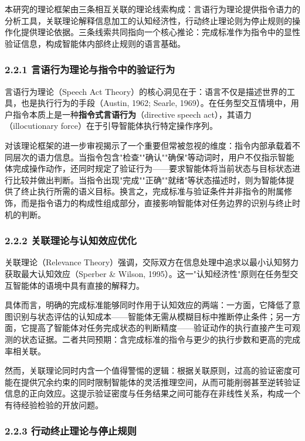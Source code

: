 \documentclass[12pt,a4paper,openany,oneside]{ctexrep}
\begin{document}
本研究的理论框架由三条相互关联的理论线索构成：言语行为理论提供指令语力的分析工具，关联理论解释信息加工的认知经济性，行动终止理论则为停止规则的操作化提供理论依据。三条线索共同指向一个核心推论：完成标准作为指令中的显性验证信息，构成智能体内部终止规则的语言基础。

\subsubsection{2.2.1 言语行为理论与指令中的验证行为}


言语行为理论（Speech Act Theory）的核心洞见在于：语言不仅是描述世界的工具，也是执行行为的手段（Austin, 1962; Searle, 1969）。在任务型交互情境中，用户指令本质上是一种\textbf{指令式言语行为}（directive speech act），其语力（illocutionary force）在于引导智能体执行特定操作序列。

对该理论框架的进一步审视揭示了一个重要但常被忽视的维度：指令内部承载着不同层次的语力信息。当指令包含"检查""确认""确保"等动词时，用户不仅指示智能体完成操作动作，还同时规定了验证行为——要求智能体将当前状态与目标状态进行比较并做出判断。当指令出现"完成""正确""就绪"等状态描述时，则为智能体提供了终止执行所需的语义目标。换言之，完成标准与验证条件并非指令的附属修饰，而是指令语力的构成性组成部分，直接影响智能体对任务边界的识别与终止时机的判断。

\subsubsection{2.2.2 关联理论与认知效应优化}


关联理论（Relevance Theory）强调，交际双方在信息处理中追求以最小认知努力获取最大认知效应（Sperber \& Wilson, 1995）。这一"认知经济性"原则在任务型交互智能体的语境中具有直接的解释力。

具体而言，明确的完成标准能够同时作用于认知效应的两端：一方面，它降低了意图识别与状态评估的认知成本——智能体无需从模糊目标中推断停止条件；另一方面，它提高了智能体对任务完成状态的判断精度——验证动作的执行直接产生可观测的状态证据。二者共同预期：含完成标准的指令与更少的执行步数和更高的完成率相关联。

然而，关联理论同时内含一个值得警惕的逻辑：根据关联原则，过高的验证密度可能在提供冗余约束的同时限制智能体的灵活推理空间，从而可能削弱甚至逆转验证信息的正向效应。这提示验证密度与任务结果之间可能存在非线性关系，构成一个有待经验检验的开放问题。

\subsubsection{2.2.3 行动终止理论与停止规则}
\end{document}
